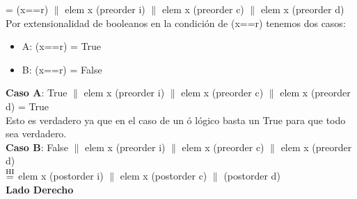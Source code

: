 \documentclass{article}
\begin{document}
= (x==r) $\|$ elem x (preorder i) $\|$ elem x (preorder c) $\|$ elem x (preorder d) \\
Por extensionalidad de booleanos en la condición de (x==r) tenemos dos casos:
\begin{itemize}
\item A: (x==r) = True 
\item B: (x==r) = False
\end{itemize}
\textbf{Caso A}: True $\|$ elem x (preorder i) $\|$ elem x (preorder c) $\|$ elem x (preorder d) = True \\
Esto es verdadero ya que en el caso de un ó lógico basta un True para que todo sea verdadero.  \\  
\textbf{Caso B}: False $\|$ elem x (preorder i) $\|$ elem x (preorder c) $\|$ elem x (preorder d) \\ 
$\stackrel{\text{HI}}{=}$ elem x (postorder i) $\|$ elem x (postorder c) $\|$ (postorder d) \\
\textbf{Lado Derecho}
\end{document}
